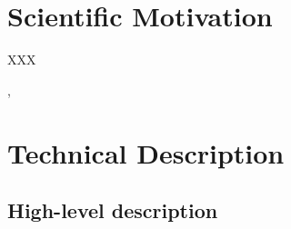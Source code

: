 \documentclass[12pt,letterpaper]{article}
\begin{document}
\clearpage

\section{Scientific Motivation}

XXX




\citep{mroz18b}

\citep{suzuki16}, \citep{udalski18b}

\citep{ivezic18}

\citep{marigo17}

\vspace{.6in}

\section{Technical Description}

\subsection{High-level description}
\end{document}
